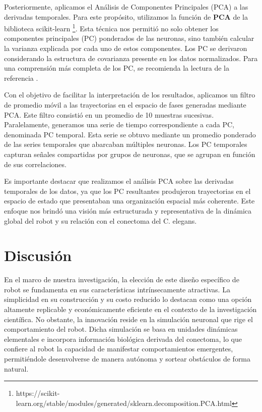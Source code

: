 Posteriormente, aplicamos el Análisis de Componentes Principales (PCA) a las derivadas temporales. Para este propósito, utilizamos la función de \textbf{PCA} de la biblioteca scikit-learn \footnote{https://scikit-learn.org/stable/modules/generated/sklearn.decomposition.PCA.html}. Esta técnica nos permitió no solo obtener los componentes principales (PC) ponderados de las neuronas, sino también calcular la varianza explicada por cada uno de estos componentes. Los PC se derivaron considerando la estructura de covarianza presente en los datos normalizados. Para una comprensión más completa de los PC, se recomienda la lectura de la referencia  \cite{noauthor_principal_2002}.

Con el objetivo de facilitar la interpretación de los resultados, aplicamos un filtro de promedio móvil a las trayectorias en el espacio de fases generadas mediante PCA. Este filtro consistió en un promedio de 10 muestras sucesivas. Paralelamente, generamos una serie de tiempo correspondiente a cada PC, denominada PC temporal. Esta serie se obtuvo mediante un promedio ponderado de las series temporales que abarcaban múltiples neuronas. Los PC temporales capturan señales compartidas por grupos de neuronas, que se agrupan en función de sus correlaciones.


Es importante destacar que realizamos el análisis PCA sobre las derivadas temporales de los datos, ya que los PC resultantes produjeron trayectorias en el espacio de estado que presentaban una organización espacial más coherente. Este enfoque nos brindó una visión más estructurada y representativa de la dinámica global del robot y su relación con el conectoma del C. elegans.



\section{Discusión}

En el marco de nuestra investigación, la elección de este diseño específico de robot se fundamenta en sus características intrínsecamente atractivas. La simplicidad en su construcción y su costo reducido lo destacan como una opción altamente replicable y económicamente eficiente en el contexto de la investigación científica. No obstante, la innovación reside en la simulación neuronal que rige el comportamiento del robot. Dicha simulación se basa en unidades dinámicas elementales e incorpora información biológica derivada del conectoma, lo que confiere al robot la capacidad de manifestar comportamientos emergentes, permitiéndole desenvolverse de manera autónoma y sortear obstáculos de forma natural.

